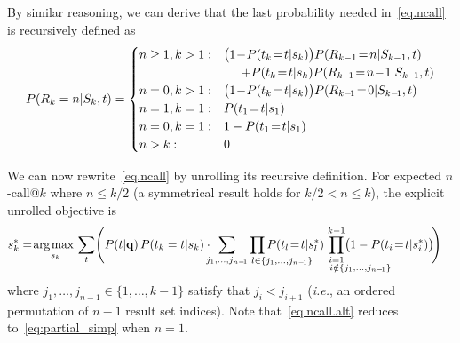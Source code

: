 By similar reasoning, we can derive that the last probability 
needed in~\eqref{eq.ncall} is recursively defined as 
\begin{align*}
P(R_k=n|S_k,t)=
\begin{cases}
n \geq 1, k > 1:  &  \bigl( 1\!-\!P(t_k\!=\!t|s_k) \bigr) P(R_{k-1}\!=\!n|S_{k-1},t) \nonumber \\
  & \hspace{5mm} + P(t_k\!=\!t|s_k) P(R_{k-\!1}\!=\!n\!-\!1|S_{k-\!1},t) \\
n = 0, k > 1:   & \bigl( 1\!-\!P(t_k\!=\!t|s_k) \bigr) P(R_{k-\!1}\!=\!0|S_{k-\!1},t) \\
n = 1, k = 1:   & P(t_1\!=\!t|s_1) \\
n = 0, k = 1:   & 1 - P(t_1\!=\!t|s_1) \\
n > k:			& 0
\end{cases}
\end{align*}

We can now rewrite~\eqref{eq.ncall} by unrolling its recursive definition.
For expected $n$-call@$k$ where $n \leq k/2$ %
(a symmetrical result holds for $k/2 < n \leq k$),
the explicit unrolled objective is 
\begin{align}
  & s_k^* = \argmax_{s_k} \sum_t \Biggl( P(t|\vec{q}) \, P(t_k=t|s_k) \cdot \hspace{-2mm} \sum_{j_1, \dots, j_{n-\!1}} \hspace{-14mm} \prod_{\hspace{14.5mm} l \in \{j_1, \dots, j_{n-\!1}\}} \hspace{-14mm} P(t_l\!=\!t|s_l^*) \hspace{-13mm} \prod_{\substack{i=1 \\ \hspace{14mm} i \notin \{j_1, \dots, j_{n-\!1}\}}}^{k-1} \hspace{-13mm} \!\bigl( 1 - P(t_i\!=\!t|s_i^*) \bigr) \!\Biggr) \label{eq.ncall.alt}
\end{align}
where $j_1, \dots, j_{n-1} \in \{1,\ldots,k-1\}$ satisfy 
that $j_i < j_{i+1}$ (\emph{i.e.},
an ordered permutation of $n-1$ result set indices).
Note that~\eqref{eq.ncall.alt} reduces to~\eqref{eq:partial_simp} when $n=1$.


